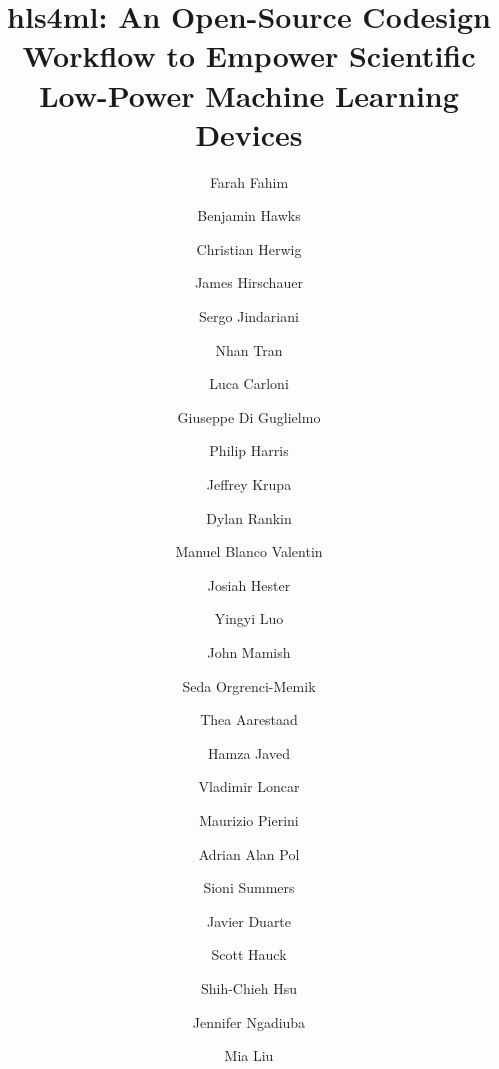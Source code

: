 \documentclass[sigconf]{acmart}
\begin{document}
\title{hls4ml: An Open-Source Codesign Workflow to Empower Scientific Low-Power Machine Learning Devices}


\author{Farah Fahim}
\author{Benjamin Hawks}
 \author{Christian Herwig}
 \author{James Hirschauer}
 \author{Sergo Jindariani}
 \author{Nhan Tran}

 \author{Luca Carloni}
 \author{Giuseppe Di Guglielmo}

 \author{Philip Harris}
 \author{Jeffrey Krupa}
 \author{Dylan Rankin}

 \author{Manuel Blanco Valentin}
 \author{Josiah Hester}
 \author{Yingyi Luo}
 \author{John Mamish}
 \author{Seda Orgrenci-Memik}

 \author{Thea Aarestaad}
 \author{Hamza Javed}
 \author{Vladimir Loncar}
 \author{Maurizio Pierini}
 \author{Adrian Alan Pol}
 \author{Sioni Summers}

 \author{Javier Duarte}

 \author{Scott Hauck}
 \author{Shih-Chieh Hsu}

 \author{Jennifer Ngadiuba}

\author{Mia Liu}
\end{document}
